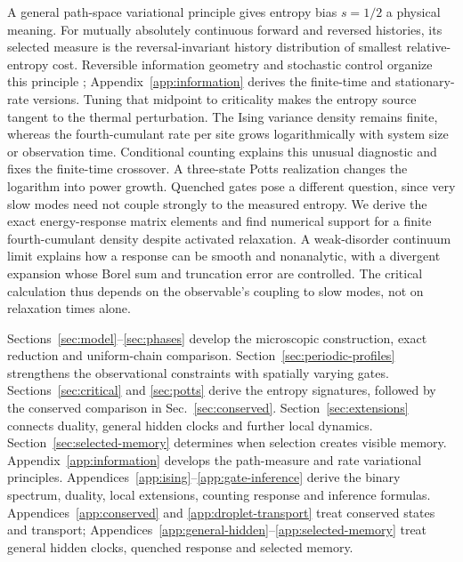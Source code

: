\documentclass[aps,pre,reprint,amsmath,amssymb,longbibliography,floatfix]{revtex4-2}
\begin{document}
A general path-space variational principle gives entropy bias $s=1/2$
a physical meaning. For mutually absolutely continuous forward and
reversed histories, its selected measure is the reversal-invariant
history distribution of smallest relative-entropy cost. Reversible
information geometry and stochastic control organize this principle
\cite{WolferWatanabe2021,Andrieux2025,ChetriteTouchetteControl2015};
Appendix~\ref{app:information} derives the finite-time and stationary-rate
versions.
Tuning that midpoint to criticality makes the entropy source tangent to
the thermal perturbation. The Ising variance density remains finite,
whereas the fourth-cumulant rate per site grows logarithmically with
system size or observation time. Conditional counting explains this
unusual diagnostic and fixes the finite-time crossover. A three-state
Potts realization changes the logarithm into power growth. Quenched gates
pose a different question, since very slow modes need not couple strongly
to the measured entropy. We derive the exact energy-response matrix
elements and find numerical support for a finite fourth-cumulant density
despite activated relaxation. A weak-disorder continuum limit explains
how a response can be smooth and nonanalytic, with a divergent expansion
whose Borel sum and truncation error are controlled. The critical
calculation thus depends on the observable's coupling to slow modes, not
on relaxation times alone.

Sections~\ref{sec:model}--\ref{sec:phases} develop the microscopic
construction, exact reduction and uniform-chain comparison.
Section~\ref{sec:periodic-profiles} strengthens the observational
constraints with spatially varying gates.
Sections~\ref{sec:critical} and \ref{sec:potts} derive the entropy
signatures, followed by the conserved comparison in
Sec.~\ref{sec:conserved}. Section~\ref{sec:extensions} connects duality,
general hidden clocks and further local dynamics.
Section~\ref{sec:selected-memory} determines when selection creates
visible memory. Appendix~\ref{app:information} develops the path-measure and rate
variational principles. Appendices~\ref{app:ising}--\ref{app:gate-inference}
derive the binary spectrum, duality, local extensions, counting response
and inference formulas. Appendices~\ref{app:conserved} and
\ref{app:droplet-transport} treat conserved states and transport;
Appendices~\ref{app:general-hidden}--\ref{app:selected-memory} treat
general hidden clocks, quenched response and selected memory.
\end{document}
